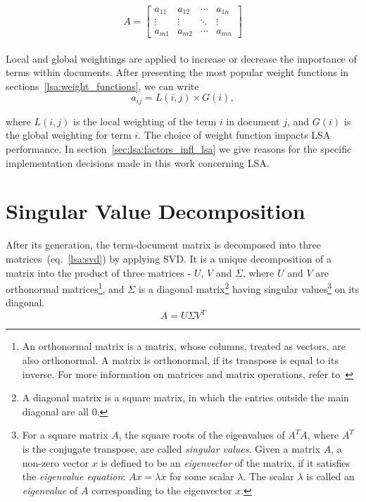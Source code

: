 %
%
\begin{equation}
A=
\begin{bmatrix}
\label{lsa:sparse_matrix_A}
 a_{11}& a_{12}& \cdots& a_{1n} \\
 \vdots& \vdots& \ddots& \vdots \\ 
 a_{m1}& a_{m2}& \cdots& a_{mn}
\end{bmatrix}
\end{equation}\\

Local and global weightings are applied to increase or decrease the importance of terms within documents. After presenting the most popular weight functions in sections~\ref{lsa:weight_functions}, we can write
%
%
\begin{equation}
\label{lsa:global_local_weighting}
a_{ij}=L(i,j) \times G(i),
\end{equation}

where $L(i,j)$ is the local weighting of the term $i$ in document $j$, and $G(i)$ is the global weighting for term $i$. The choice of weight function impacts \gls{LSA} performance. In section~\ref{sec:lsa:factors_infl_lsa} we give reasons for the specific implementation decisions made in this work concerning \gls{LSA}. \\

\section{Singular Value Decomposition}
\label{sec:lsa:svd}

After its generation, the term-document matrix is decomposed into three matrices~(eq.~\ref{lsa:svd}) by applying \gls{SVD}. It is a unique decomposition of a matrix into the product of three matrices - $U$, $V$ and $\Sigma$, where $U$ and $V$ are orthonormal matrices\footnote{An orthonormal matrix is a matrix, whose columns, treated as 
 vectors, are also orthonormal. A matrix is orthonormal, if its transpose is equal to its inverse. For more information on matrices and matrix operations, refer to~\cite{MatrixCompGolub96}}, and $ \Sigma $ is a diagonal matrix\footnote{A diagonal matrix is a square matrix, in which the entries outside the main diagonal are all $0$.} having singular values\footnote{For a square matrix $A$, the square roots of the eigenvalues of $A^{T}A$, where $A^{T}$ is the conjugate transpose, are called \textit{singular values}. Given a matrix $A$, a non-zero vector $x$ is defined to be an \textit{eigenvector} of the matrix, if it satisfies the \textit{eigenvalue equation}: $Ax=\lambda x$ for some scalar $ \lambda $. The scalar $ \lambda $ is called an \textit{eigenvalue} of $A$ corresponding to the eigenvector $x$.\cite{MatrixCompGolub96}} on its diagonal.\\
%
%
\begin{equation}
\label{lsa:svd}
A=U \Sigma V^{T}
\end{equation}

